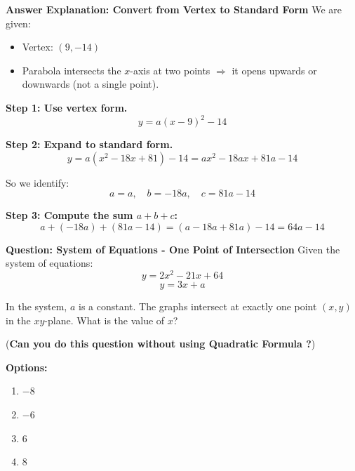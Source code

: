\documentclass{beamer}
\begin{document}
\begin{frame}{\textbf{Answer Explanation: Convert from Vertex to Standard Form}}
We are given:
\begin{itemize}
    \item Vertex: \( (9, -14) \)
    \item Parabola intersects the \(x\)-axis at two points \( \Rightarrow \) it opens upwards or downwards (not a single point).
\end{itemize}

\textbf{Step 1: Use vertex form.}
\[
y = a(x - 9)^2 - 14
\]

\textbf{Step 2: Expand to standard form.}
\[
y = a(x^2 - 18x + 81) - 14 = ax^2 - 18a x + 81a - 14
\]

So we identify:
\[
a = a, \quad b = -18a, \quad c = 81a - 14
\]

\textbf{Step 3: Compute the sum \(a + b + c\):}
\[
a + (-18a) + (81a - 14) = (a - 18a + 81a) - 14 = 64a - 14
\]


\end{frame}


\begin{frame}{\textbf{Question: System of Equations - One Point of Intersection}}
Given the system of equations:
\[
y = 2x^2 - 21x + 64
\]
\[
y = 3x + a
\]

In the system, \(a\) is a constant. The graphs intersect at exactly one point \((x, y)\) in the \(xy\)-plane. What is the value of \(x\)? 

(\textbf{Can you do this question without using Quadratic Formula ?})

\vspace{0.2cm}
\textbf{Options:}
\begin{enumerate}
    \item[A.] \(-8\)
    \item[B.] \(-6\)
    \item[C.] \(6\)
    \item[D.] \(8\)
\end{enumerate}
\end{frame}
\end{document}

